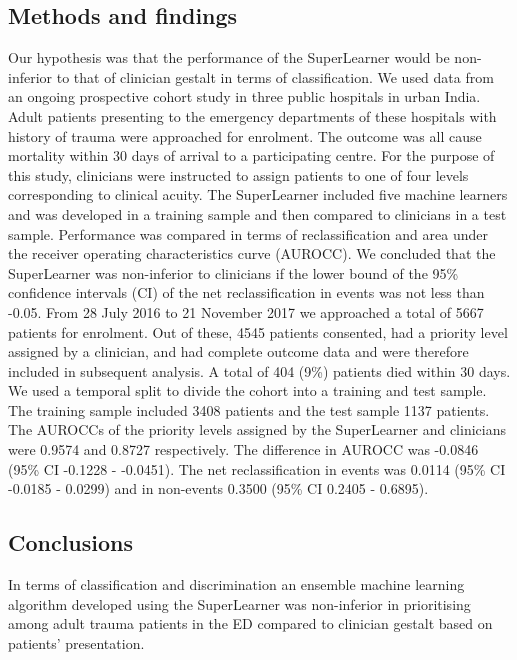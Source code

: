 \documentclass[10pt,letterpaper]{article}\usepackage[]{graphicx}\usepackage[]{color}
\begin{document}
\subsection*{Methods and findings}
Our hypothesis was that the performance of the SuperLearner would be
non-inferior to that of clinician gestalt in terms of classification. We used
data from an ongoing prospective cohort study in three public hospitals in urban
India. Adult patients presenting to the emergency departments of these hospitals
with history of trauma were approached for enrolment. The outcome was all cause
mortality within 30 days of arrival to a participating centre. For the purpose
of this study, clinicians were instructed to assign patients to one of four
levels corresponding to clinical acuity. The SuperLearner included five machine
learners and was developed in a training sample and then compared to clinicians
in a test sample. Performance was compared in terms of reclassification and area
under the receiver operating characteristics curve (AUROCC). We concluded that
the SuperLearner was non-inferior to clinicians if the lower bound of the 95\%
confidence intervals (CI) of the net reclassification in events was not less
than -0.05. From 28 July 2016 to 21 November 2017 we approached a total of
5667 patients for enrolment. Out of these,
4545 patients consented, had a priority
level assigned by a clinician, and had complete outcome data and were therefore
included in subsequent analysis. A total of 404 (9\%)
patients died within 30 days. We used a temporal split to divide the cohort into
a training and test sample. The training sample included
3408 patients and the test sample 1137
patients. The AUROCCs of the priority levels assigned by the SuperLearner and
clinicians were 0.9574 and 0.8727
respectively. The difference in AUROCC was
-0.0846 (95\% CI -0.1228 - -0.0451). The net reclassification in events was
0.0114 (95\% CI -0.0185 - 0.0299) and in non-events 0.3500 (95\% CI 0.2405 - 0.6895).

\subsection*{Conclusions}
In terms of classification and discrimination an ensemble machine learning
algorithm developed using the SuperLearner was non-inferior in prioritising
among adult trauma patients in the ED compared to clinician gestalt based on
patients’ presentation.

\end{document}
